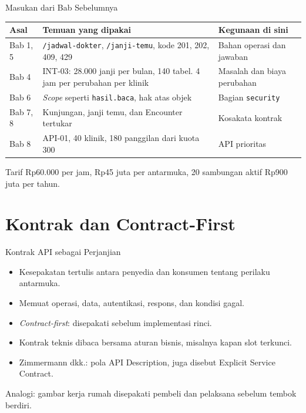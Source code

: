 \documentclass[aspectratio=169, table, 12pt]{beamer}
\begin{document}
\begin{frame}{{\Large Masukan dari Bab Sebelumnya}}
  \footnotesize
  \begin{tabularx}{\textwidth}{>{\raggedright\arraybackslash}p{1.3cm} >{\raggedright\arraybackslash}X >{\raggedright\arraybackslash}p{5.0cm}}
    \hline
    \textbf{Asal} & \textbf{Temuan yang dipakai} & \textbf{Kegunaan di sini} \\ \hline
    Bab 1, 5 & \texttt{/jadwal-dokter}, \texttt{/janji-temu}, kode 201, 202, 409, 429 & Bahan operasi dan jawaban \\ \hline
    Bab 4 & INT-03: 28.000 janji per bulan, 140 tabel. 4 jam per perubahan per klinik & Masalah dan biaya perubahan \\ \hline
    Bab 6 & \textit{Scope} seperti \texttt{hasil.baca}, hak atas objek & Bagian \texttt{security} \\ \hline
    Bab 7, 8 & Kunjungan, janji temu, dan Encounter tertukar & Kosakata kontrak \\ \hline
    Bab 8 & API-01, 40 klinik, 180 panggilan dari kuota 300 & API prioritas \\ \hline
  \end{tabularx}

  \vspace{8pt}
  \small Tarif Rp60.000 per jam, Rp45 juta per antarmuka, 20 sambungan aktif Rp900 juta per tahun.
\end{frame}

\section{Kontrak dan Contract-First}

\begin{frame}{{\Large Kontrak API sebagai Perjanjian}}
  \vspace{8pt}
  \begin{itemize}
    \item Kesepakatan tertulis antara penyedia dan konsumen tentang perilaku antarmuka.
    \item Memuat operasi, data, autentikasi, respons, dan kondisi gagal.
    \item \textit{Contract-first}: disepakati sebelum implementasi rinci.
    \item Kontrak teknis dibaca bersama aturan bisnis, misalnya kapan slot terkunci.
    \item Zimmermann dkk.: pola API Description, juga disebut Explicit Service Contract.
  \end{itemize}
  \vspace{6pt}
  {\small Analogi: gambar kerja rumah disepakati pembeli dan pelaksana sebelum tembok berdiri.}
\end{frame}
\end{document}
